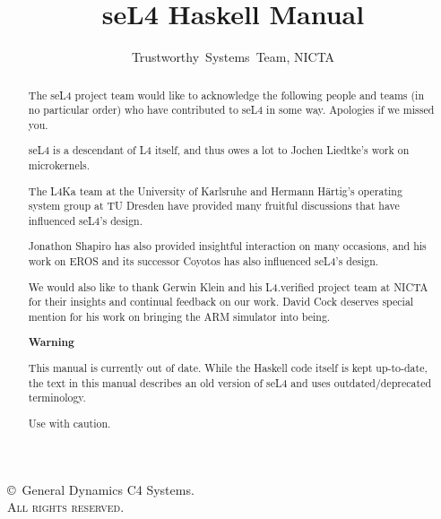 \documentclass[a4paper,11pt,twoside]{report}
\newcommand{\softwareversion}{}
\begin{document}
\title{seL4 Haskell Manual}
\author{Trustworthy~Systems~Team, NICTA}
\date{\softwareversion}

\maketitle

  \thispagestyle{empty}

  \vfill

  \copyright\ General Dynamics C4 Systems.\\

  \textsc{All rights reserved}.

  \thispagestyle{empty}
  \vfill
  \renewcommand{\abstractname}{Acknowledgements}
  \begin{abstract}
The seL4 project team would like to acknowledge the following people
and teams (in no particular order) who have contributed to seL4 in
some way. Apologies if we missed you.

seL4 is a descendant of L4 itself, and thus owes a lot to Jochen
Liedtke's work on microkernels.

The L4Ka team at the University of Karlsruhe and Hermann H\"{a}rtig's
operating system group at TU Dresden have provided many fruitful
discussions that have influenced seL4's design.

Jonathon Shapiro has also provided insightful interaction on many
occasions, and his work on EROS and its successor Coyotos has also
influenced seL4's design.

We would also like to thank Gerwin Klein and his L4.verified
project team at NICTA for their insights and continual feedback on
our work. David Cock deserves special mention for his work on
bringing the ARM simulator into being.

\vspace{5ex}
\begin{center}
{\large\textbf{Warning}}
\end{center}
This manual is currently out of date. While the Haskell code itself is kept
up-to-date, the text in this manual describes an old version of seL4 and uses
outdated/deprecated terminology.
\begin{center}
Use with caution.
\end{center}
\end{abstract}

  \thispagestyle{empty}

  \cleardoublepage
  \setcounter{page}{1}
  \tableofcontents
\end{document}
